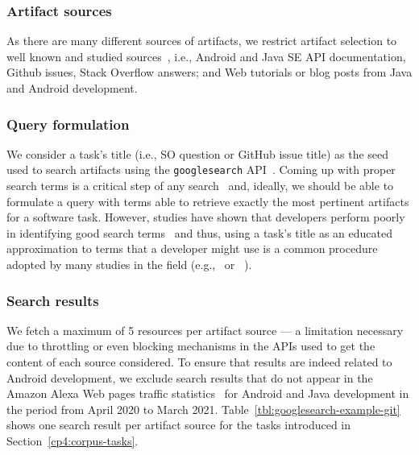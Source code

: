 \subsubsection{Artifact sources}

As there are many different sources of artifacts, we restrict artifact selection to well known and studied sources~\cite{Starke2009,Kevic2014, Li2013}, i.e.,
Android and Java SE API documentation, Github issues, Stack Overflow answers; and Web tutorials or blog posts from Java and Android development.



\subsubsection{Query formulation}



We consider a task's title (i.e., SO question or GitHub issue title) as the seed used to search artifacts
using the \texttt{googlesearch} API~\cite{googlesearch}.
Coming up with proper search terms is a critical step of any search~\cite{Haiduc2013}
and, ideally, we should be able to formulate a query with terms able to retrieve exactly the most pertinent artifacts for a software task.
However, studies have shown that developers perform poorly in identifying good search terms~\cite{Starke2009,Kevic2014, Li2013} and thus, using a task's title
as an educated approximation to terms that a developer might use is a common procedure adopted by many studies in the field (e.g.,~\cite{Xu2017} or ~\cite{Silva2019}).







\subsubsection{Search results}


We fetch a maximum of 5 resources per artifact source --- a limitation necessary due to throttling or even blocking mechanisms in the APIs used to get the content of each source considered. To ensure that results 
are indeed related to Android development, we exclude search results that do not appear in the Amazon Alexa Web pages traffic statistics~\cite{alexa}
for Android and Java development in the period from April 2020 to March 2021. Table~\ref{tbl:googlesearch-example-git} shows one search result per artifact source for the tasks introduced in Section~\ref{cp4:corpus-tasks}.



